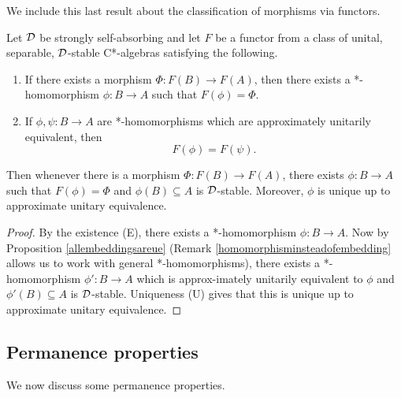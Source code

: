 \documentclass[12pt]{amsart}
\begin{document}
  We include this last result about the classification of morphisms via functors. 

  \begin{theorem}
      Let $\mathcal{D}$ be strongly self-absorbing and let $F$ be a functor from a class of unital, separable, $\mathcal{D}$-stable C*-algebras satisfying the following.
        \begin{enumerate}
          \item[(E)] If there exists a morphism $\Phi: F(B) \to F(A)$, then there exists a *-homomorphism $\phi: B \to A$ such that $F(\phi) = \Phi$.
          \item[(U)] If $\phi,\psi: B \to A$ are *-homomorphisms which are approximately unitarily equivalent, then
\begin{equation}
             F(\phi) = F(\psi).
\end{equation}
        \end{enumerate}
        Then whenever there is a morphism $\Phi: F(B) \to F(A)$, there exists $\phi: B \to A$ such that  $F(\phi) = \Phi$ and $\phi(B)  \subseteq A$ is $\mathcal{D}$-stable.
        Moreover, $\phi$ is unique up to approximate unitary equivalence.
          \begin{proof}
            By the existence (E), there exists a *-homomorphism $\phi: B \to A$. Now by Proposition \ref{allembeddingsareue} (Remark \ref{homomorphisminsteadofembedding} allows us to work with general *-homomorphisms), there exists a *-homomorphism $\phi': B \to A$ which is approx\hyp{}imately unitarily equivalent to $\phi$ and $\phi'(B) \subseteq A$ is $\mathcal{D}$-stable.
            Uniqueness (U) gives that this is unique up to approximate unitary equivalence. 
          \end{proof}
    \end{theorem}

  \subsection{Permanence properties}\label{ssection:dse-permanence}
  We now discuss some permanence properties.
\end{document}
